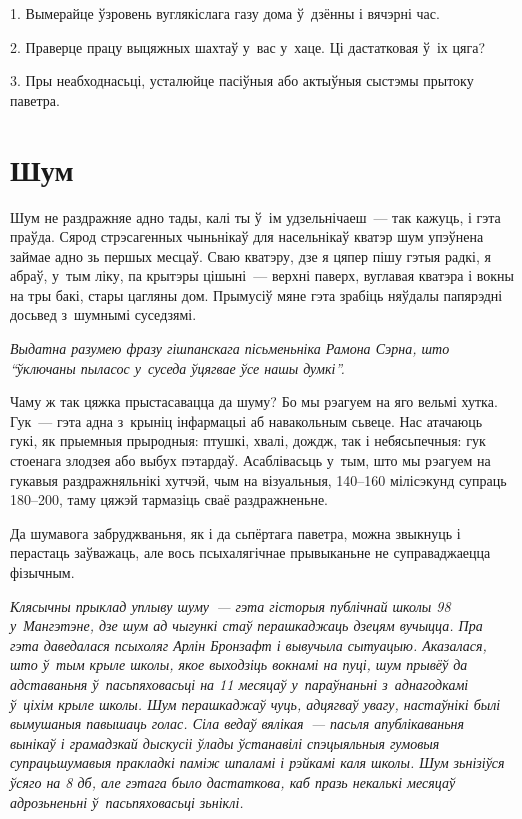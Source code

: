 1. Вымерайце ўзровень вуглякіслага газу дома ў~дзённы і вячэрні час.

2. Праверце працу выцяжных шахтаў у~вас у~хаце. Ці дастатковая ў~іх цяга?

3. Пры неабходнасьці, усталюйце пасіўныя або актыўныя сыстэмы прытоку паветра.


\section{Шум}

Шум не раздражняе адно тады, калі ты ў~ім удзельнічаеш~--- так кажуць, і гэта праўда. Сярод стрэсагенных чыньнікаў для насельнікаў кватэр шум упэўнена займае адно зь першых месцаў. Сваю кватэру, дзе я цяпер пішу гэтыя радкі, я абраў, у~тым ліку, па крытэры цішыні~--- верхні паверх, вуглавая кватэра і вокны на тры бакі, стары цагляны дом. Прымусіў мяне гэта зрабіць няўдалы папярэдні досьвед з~шумнымі суседзямі. 

\emph{Выдатна разумею фразу гішпанскага пісьменьніка Рамона Сэрна, што ``ўключаны пыласос у~суседа ўцягвае ўсе нашы думкі''.}

Чаму ж так цяжка прыстасавацца да шуму? Бо мы рэагуем на яго вельмі хутка. Гук~--- гэта адна з~крыніц інфармацыі аб навакольным сьвеце. Нас атачаюць гукі, як прыемныя прыродныя: птушкі, хвалі, дождж, так і небясьпечныя: гук стоенага злодзея або выбух пэтардаў. Асаблівасьць у~тым, што мы рэагуем на гукавыя раздражняльнікі хутчэй, чым на візуальныя, 140--160 мілісэкунд супраць 180--200, таму цяжэй тармазіць сваё раздражненьне.


Да шумавога забруджваньня, як і да сьпёртага паветра, можна звыкнуць і перастаць заўважаць, але вось псыхалягічнае прывыканьне не суправаджаецца фізычным.

\emph{Клясычны прыклад уплыву шуму~--- гэта гісторыя публічнай школы 98 у~Мангэтэне, дзе шум ад чыгункі стаў перашкаджаць дзецям вучыцца. Пра гэта даведалася псыхоляг Арлін Бронзафт і вывучыла сытуацыю. Аказалася, што ў~тым крыле школы, якое выходзіць вокнамі на пуці, шум прывёў да адставаньня ў~пасьпяховасьці на 11 месяцаў у~параўнаньні з~аднагодкамі ў~ціхім крыле школы. Шум перашкаджаў чуць, адцягваў увагу, настаўнікі былі вымушаныя павышаць голас. Сіла ведаў вялікая~--- пасьля апублікаваньня вынікаў і грамадзкай дыскусіі ўлады ўстанавілі спэцыяльныя гумовыя супрацьшумавыя пракладкі паміж шпаламі і рэйкамі каля школы. Шум зьнізіўся ўсяго на 8 дб, але гэтага было дастаткова, каб празь некалькі месяцаў адрозьненьні ў~пасьпяховасьці зьніклі.}

